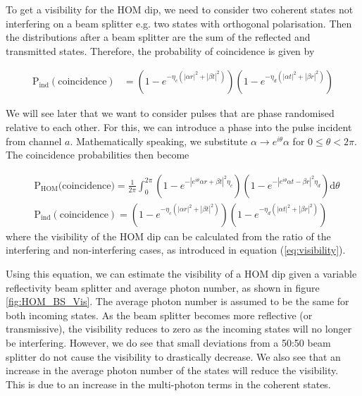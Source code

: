 To get a visibility for the HOM dip, we need to consider two coherent states not interfering on a beam splitter e.g. two states with orthogonal polarisation. Then the distributions after a beam splitter are the sum of the reflected and transmitted states. Therefore, the probability of coincidence is given by


\begin{align}
	\text{P}_\text{ind}(\text{coincidence}) &= \left(1 - e^{-\eta_c(|\alpha r|^2 + |\beta t|^2)}\right)\left(1 - e^{-\eta_d(|\alpha t|^2 + |\beta r|^2)}\right)
\end{align}

We will see later that we want to consider pulses that are phase randomised relative to each other. For this, we can introduce a phase into the pulse incident from channel $a$. Mathematically speaking, we substitute $\alpha \rightarrow  e^{i\theta} \alpha$ for $0\le\theta < 2\pi$. The coincidence probabilities then become

\begin{align}
	&\text{P}_\text{HOM}\text{(coincidence)} = \frac{1}{2\pi}\int_0^{2\pi}\left(1 - e^{-|e^{i\theta}\alpha r + \beta t|^2 \eta_c}\right)\left(1 - e^{-|e^{i\theta}\alpha t - \beta r|^2 \eta_d}\right)\text{d}\theta\\
	&\text{P}_\text{ind}(\text{coincidence}) = \left(1 - e^{-\eta_c(|\alpha r|^2 + |\beta t|^2)}\right)\left(1 - e^{-\eta_d(|\alpha t|^2 + |\beta r|^2)}\right)
\end{align}
where the visibility of the HOM dip can be calculated from the ratio of the interfering and non-interfering cases, as introduced in equation (\ref{eq:visibility}).

Using this equation, we can estimate the visibility of a \ac{HOM} dip given a variable reflectivity beam splitter and average photon number, as shown in figure \ref{fig:HOM_BS_Vis}. The average photon number is assumed to be the same for both incoming states. As the beam splitter becomes more reflective (or transmissive), the visibility reduces to zero as the incoming states will no longer be interfering. However, we do see that small deviations from a {50:50} beam splitter do not cause the visibility to drastically decrease. We also see that an increase in the average photon number of the states will reduce the visibility. This is due to an increase in the multi-photon terms in the coherent states.

